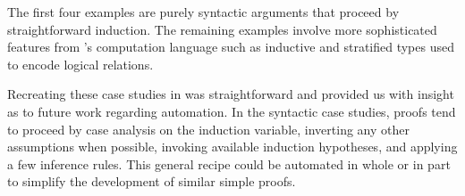 The first four examples are purely syntactic arguments that proceed by
straightforward induction.
The remaining examples involve more sophisticated features from \Beluga's
computation language such as inductive and stratified types used to encode
logical relations.

Recreating these case studies in \Harpoon{} was straightforward and provided us
with insight as to future work regarding automation. In the syntactic case
studies, proofs tend to proceed by case analysis on the induction variable,
inverting any other assumptions when possible, invoking available induction
hypotheses, and applying a few inference rules. This general recipe could be
automated in whole or in part to simplify the development of similar simple
proofs.


